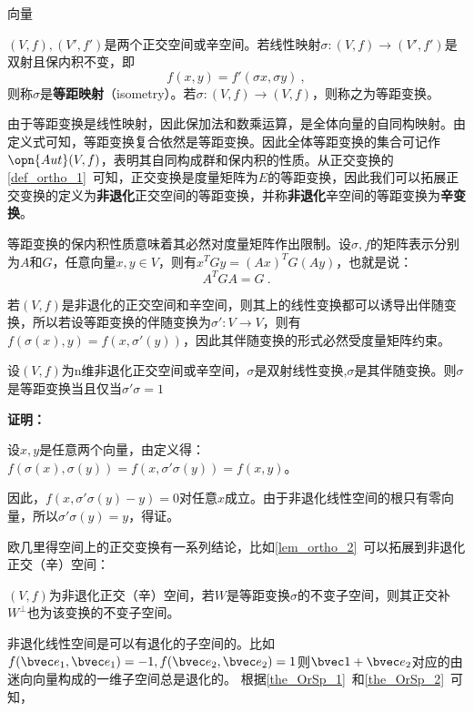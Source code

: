 
\begin{issues}
\issueDraft 向量
\end{issues}


\begin{definition}{}
$(V,f),(V',f')$是两个正交空间或辛空间。若线性映射$\sigma:(V,f)\rightarrow (V',f')$是双射且保内积不变，即\begin{equation}
f(x,y)=f'(\sigma x,\sigma y)~,
\end{equation}
则称$\sigma $是\textbf{等距映射}（isometry）。若$\sigma:(V,f)\rightarrow (V,f)$，则称之为等距变换。
\end{definition}
由于等距变换是线性映射，因此保加法和数乘运算，是全体向量的自同构映射。由定义式可知，等距变换复合依然是等距变换。因此全体等距变换的集合可记作$\opn{Aut}(V,f)$，表明其自同构成群和保内积的性质。从正交变换的\autoref{def_ortho_1}~可知，正交变换是度量矩阵为$E$的等距变换，因此我们可以拓展正交变换的定义为\textbf{非退化}正交空间的等距变换，并称\textbf{非退化}辛空间的等距变换为\textbf{辛变换}。

等距变换的保内积性质意味着其必然对度量矩阵作出限制。设$\sigma,f$的矩阵表示分别为$A$和$G$，任意向量$x,y\in V$，则有$x^{T}Gy=(Ax)^TG(Ay)$，也就是说：
\begin{equation}
A^TGA=G~.
\end{equation}

若$(V,f)$是非退化的正交空间和辛空间，则其上的线性变换都可以诱导出伴随变换，所以若设等距变换的伴随变换为$\sigma':V\rightarrow V$，则有$f(\sigma(x),y)=f(x,\sigma'(y))$，因此其伴随变换的形式必然受度量矩阵约束。
\begin{theorem}{}
设$(V,f)$为n维非退化正交空间或辛空间，$\sigma$是双射线性变换,$\sigma$是其伴随变换。则$\sigma$是等距变换当且仅当$\sigma'\sigma=1$
\end{theorem}
\textbf{证明：}

设$x,y$是任意两个向量，由定义得：$f(\sigma(x),\sigma(y))=f(x,\sigma'\sigma(y))=f(x,y)$。

因此，$f(x,\sigma'\sigma(y)-y)=0$对任意$x$成立。由于非退化线性空间的根只有零向量，所以$\sigma'\sigma(y)=y$，得证。

欧几里得空间上的正交变换有一系列结论，比如\autoref{lem_ortho_2}~可以拓展到非退化正交（辛）空间：
\begin{theorem}{}
$(V,f)$为非退化正交（辛）空间，若$W$是等距变换$\sigma$的不变子空间，则其正交补$W^{\bot}$也为该变换的不变子空间。
\end{theorem}


非退化线性空间是可以有退化的子空间的。比如$f(\bvec e_1,\bvec e_1)=-1,f(\bvec e_2,\bvec e_2)=1$则$\bvec 1+\bvec e_2$对应的由迷向向量构成的一维子空间总是退化的。
根据\autoref{the_OrSp_1}~和\autoref{the_OrSp_2}~可知，